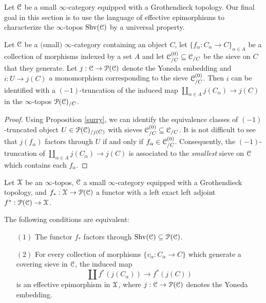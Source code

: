 Let $\operatorname{\mathcal{C}}$ be a small $\infty$-category equipped with a Grothendieck topology. 
Our final goal in this section is to use the language of effective epimorphisms to characterize
the $\infty$-topos $\operatorname{Shv}(\operatorname{\mathcal{C}})$ by a universal property.

\begin{lemma}\label{stubba}
Let $\operatorname{\mathcal{C}}$ be a $($small$)$ $\infty$-category containing an object $C$, let
$\{ f_{\alpha}: C_{\alpha} \rightarrow C \}_{\alpha \in A}$ be a collection of morphisms indexed by a set $A$ and let $\operatorname{\mathcal{C}}^{(0)}_{/C} \subseteq \operatorname{\mathcal{C}}_{/C}$ be the sieve on $C$ that they generate.
Let $j: \operatorname{\mathcal{C}} \rightarrow \operatorname{\mathcal{P}}(\operatorname{\mathcal{C}})$ denote the Yoneda embedding and $i: U \rightarrow j(C)$
a monomorphism corresponding to the sieve $\operatorname{\mathcal{C}}^{(0)}_{/C}$. Then $i$ can be identified with a $(-1)$-truncation of the induced map $\coprod_{\alpha \in A} j(C_{\alpha}) \rightarrow j(C)$
in the $\infty$-topos $\operatorname{\mathcal{P}}(\operatorname{\mathcal{C}})_{/C}$.
\end{lemma}

\begin{proof}
Using Proposition \ref{surry}, we can identify the equivalence classes of $(-1)$-truncated object $U \in \operatorname{\mathcal{P}}(\operatorname{\mathcal{C}})_{/j(C)}$ with sieves $\operatorname{\mathcal{C}}^{(0)}_{/C} \subseteq \operatorname{\mathcal{C}}_{/C}$. It is not difficult to see that $j( f_{\alpha})$ factors through $U$ if and only if $f_{\alpha} \in \operatorname{\mathcal{C}}^{(0)}_{/C}$. 
Consequently, the $(-1)$-truncation of $\coprod_{\alpha \in A} j(C_{\alpha}) \rightarrow j(C)$
is associated to the {\em smallest} sieve on $\operatorname{\mathcal{C}}$ which contains each $f_{\alpha}$.
\end{proof}

\begin{lemma}\label{pregrute}
Let $\operatorname{\mathcal{X}}$ be an $\infty$-topos, $\operatorname{\mathcal{C}}$ a small $\infty$-category equipped with a Grothendieck topology, and $f_{\ast}: \operatorname{\mathcal{X}} \rightarrow \operatorname{\mathcal{P}}(\operatorname{\mathcal{C}})$ a functor with a left exact
left adjoint $f^{\ast}: \operatorname{\mathcal{P}}(\operatorname{\mathcal{C}}) \rightarrow \operatorname{\mathcal{X}}$.

The following conditions are equivalent:
\begin{itemize}
\item[$(1)$] The functor $f_{\ast}$ factors through $\operatorname{Shv}(\operatorname{\mathcal{C}}) \subseteq \operatorname{\mathcal{P}}(\operatorname{\mathcal{C}})$.

\item[$(2)$] For every collection of morphisms $\{ v_{\alpha}: C_{\alpha} \rightarrow C\}$ which generate
a covering sieve in $\operatorname{\mathcal{C}}$, the induced map
$$ \coprod f^{\ast}( j(C_{\alpha}) ) \rightarrow f^{\ast} ( j(C) )$$
is an effective epimorphism in $\operatorname{\mathcal{X}}$, where $j: \operatorname{\mathcal{C}} \rightarrow \operatorname{\mathcal{P}}(\operatorname{\mathcal{C}})$ denotes the Yoneda embedding.
\end{itemize}
\end{lemma}

